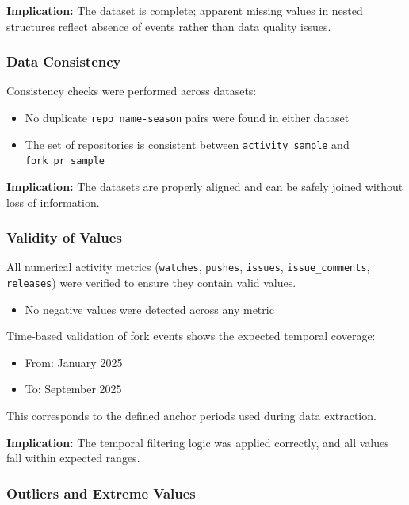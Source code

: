 \textbf{Implication:} The dataset is complete; apparent missing values in nested structures reflect absence of events rather than data quality issues.

\subsubsection{Data Consistency}

Consistency checks were performed across datasets:

\begin{itemize}
    \item No duplicate \texttt{repo\_name-season} pairs were found in either dataset
    \item The set of repositories is consistent between \texttt{activity\_sample} and \texttt{fork\_pr\_sample}
\end{itemize}

\textbf{Implication:} The datasets are properly aligned and can be safely joined without loss of information.

\subsubsection{Validity of Values}

All numerical activity metrics (\texttt{watches}, \texttt{pushes}, \texttt{issues}, \texttt{issue\_comments}, \texttt{releases}) were verified to ensure they contain valid values.

\begin{itemize}
    \item No negative values were detected across any metric
\end{itemize}

Time-based validation of fork events shows the expected temporal coverage:
\begin{itemize}
    \item From: January 2025
    \item To: September 2025
\end{itemize}

This corresponds to the defined anchor periods used during data extraction.

\textbf{Implication:} The temporal filtering logic was applied correctly, and all values fall within expected ranges.

\subsubsection{Outliers and Extreme Values}

